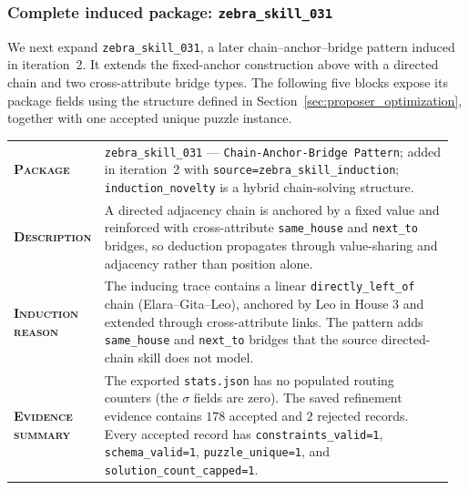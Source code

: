 \subsubsection{Complete induced package: \texttt{zebra\_skill\_031}}
\label{app:complete_logical_skill}

We next expand \texttt{zebra\_skill\_031}, a later chain--anchor--bridge pattern induced in iteration~2. It extends the fixed-anchor construction above with a directed chain and two cross-attribute bridge types. The following five blocks expose its package fields using the structure defined in Section~\ref{sec:proposer_optimization}, together with one accepted unique puzzle instance.

\begin{table}[htbp]
\centering
\begin{minipage}{0.97\textwidth}
\raggedright
\small
\setlength{\tabcolsep}{3pt}
\renewcommand{\arraystretch}{1.16}
\vspace{0.35em}
\begin{tabular}{@{}>{\raggedright\arraybackslash\bfseries}p{0.17\linewidth} >{\raggedright\arraybackslash}p{0.79\linewidth}@{}}
    \textsc{Package} & \texttt{zebra\_skill\_031} --- \texttt{Chain-Anchor-Bridge Pattern}; added in iteration~2 with \texttt{source=zebra\_skill\_induction}; \texttt{induction\_novelty} is a hybrid chain-solving structure. \\
    \textsc{Description} & A directed adjacency chain is anchored by a fixed value and reinforced with cross-attribute \texttt{same\_house} and \texttt{next\_to} bridges, so deduction propagates through value-sharing and adjacency rather than position alone. \\
    \textsc{Induction reason} & The inducing trace contains a linear \texttt{directly\_left\_of} chain (Elara--Gita--Leo), anchored by Leo in House 3 and extended through cross-attribute links. The pattern adds \texttt{same\_house} and \texttt{next\_to} bridges that the source directed-chain skill does not model. \\
    \textsc{Evidence summary} & The exported \texttt{stats.json} has no populated routing counters (the $\sigma$ fields are zero). The saved refinement evidence contains $178$ accepted and $2$ rejected records. Every accepted record has \texttt{constraints\_valid=1}, \texttt{schema\_valid=1}, \texttt{puzzle\_unique=1}, and \texttt{solution\_count\_capped=1}. \\
\end{tabular}
\vspace{0.45em}
\end{minipage}
\end{table}

